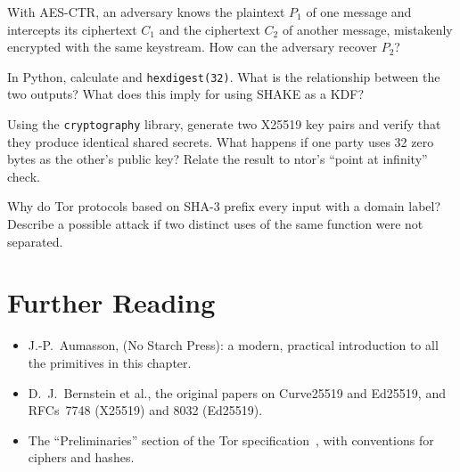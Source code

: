 \begin{esercizio}[1]\label{es:05-xor}
With AES-CTR, an adversary knows the plaintext $P_1$ of one message and intercepts its ciphertext $C_1$ and the ciphertext $C_2$ of another message, mistakenly encrypted with the same keystream. How can the adversary recover $P_2$?
\end{esercizio}

\begin{esercizio}[1]\label{es:05-shake}
In Python, calculate  and \texttt{hexdigest(32)}. What is the relationship between the two outputs? What does this imply for using SHAKE as a KDF?
\end{esercizio}

\begin{esercizio}[2]\label{es:05-dh}
Using the \texttt{cryptography} library, generate two X25519 key pairs and verify that they produce identical shared secrets. What happens if one party uses 32 zero bytes as the other's public key? Relate the result to ntor's \enquote{point at infinity} check.
\end{esercizio}

\begin{esercizio}[2]\label{es:05-etichette}
Why do Tor protocols based on SHA-3 prefix every input with a domain label? Describe a possible attack if two distinct uses of the same function were not separated.
\end{esercizio}

\section*{Further Reading}
\begin{itemize}
  \item J.-P.~Aumasson,  (No Starch Press): a modern, practical introduction to all the primitives in this chapter.
  \item D.~J.~Bernstein et al., the original papers on Curve25519 and Ed25519, and RFCs~7748 (X25519) and 8032 (Ed25519).
  \item The \enquote{Preliminaries} section of the Tor specification~\cite{torspec}, with conventions for ciphers and hashes.
\end{itemize}
